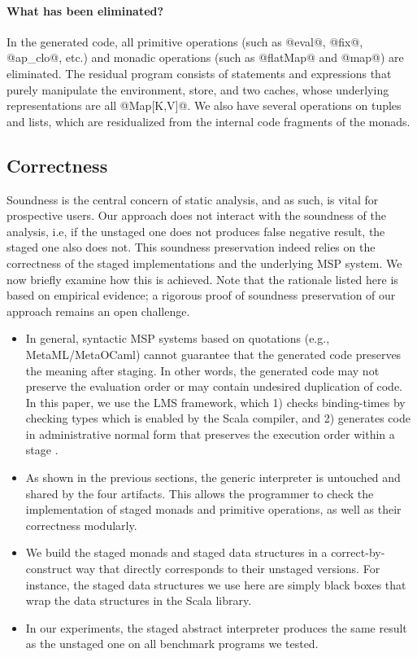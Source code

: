 \paragraph{What has been eliminated?} In the generated code, all
primitive operations (such as @eval@, @fix@, @ap_clo@, etc.) and monadic
operations (such as @flatMap@ and @map@) are eliminated. The residual program
consists of statements and expressions that purely manipulate the environment,
store, and two caches, whose underlying representations are all @Map[K,V]@.
We also have several operations on tuples and lists, which are residualized from
the internal code fragments of the monads. 

\subsection{Correctness}

Soundness is the central concern of static analysis, and as such, is vital for
prospective users. Our approach does not interact with the soundness of the analysis,
i.e, if the unstaged one does not produces false negative result, the staged
one also does not. This soundness preservation indeed relies on the correctness
of the staged implementations and the underlying MSP system. We now briefly
examine how this is achieved. Note that the rationale listed
here is based on empirical evidence; a rigorous proof of soundness
preservation of our approach remains an open challenge.

\begin{itemize}
  \item 
    In general, syntactic MSP systems based on quotations (e.g.,
    MetaML/MetaOCaml) cannot guarantee that the generated code preserves the
    meaning after staging. In other words, the generated code may not preserve
    the evaluation order or may contain undesired duplication of code.
    In this paper, we use the LMS framework, which 1) checks binding-times by
    checking types which is enabled by the Scala compiler, and 2) generates
    code in administrative normal form \cite{Flanagan:1993:ECC:155090.155113}
    that preserves the execution order within a stage
    \cite{DBLP:conf/birthday/Rompf16}.
  \item As shown in the previous sections, the generic interpreter is untouched
    and shared by the four artifacts.  This allows the programmer to
    check the implementation of staged monads and primitive operations,
    as well as their correctness modularly.
  \item We build the staged monads and staged data structures in a
    correct-by-construct way that directly corresponds to their unstaged
    versions. For instance, the staged data structures we use here are simply
    black boxes that wrap the data structures in the Scala library.
  \item In our experiments, the staged abstract interpreter produces the same
    result as the unstaged one on all benchmark programs we tested.
\end{itemize}

